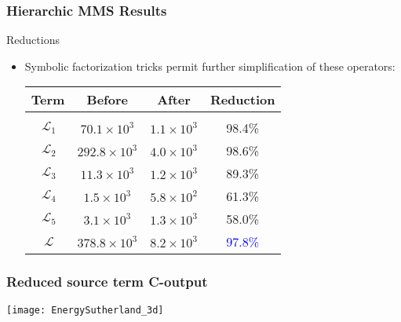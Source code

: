 \documentclass[mathserif]{beamer}
\newcommand{\Lo}{\,\mathcal{L}}
\begin{document}
\begin{frame}
  \frametitle{Hierarchic MMS Results}
  \begin{block}{Reductions}
    \begin{itemize}
    \item Symbolic factorization tricks permit further simplification of these operators:
      \newline
      \begin{table}[htb]
        \centering
        \begin{tabular}{c c c c}
          \hline
          Term & Before & After & Reduction\\
          \hline \vspace{-8pt} \\
          $\Lo_1$ & $70.1 \times 10^3$ & $1.1 \times 10^3$ & 98.4\%\\ 
          $\Lo_2$ & $292.8\times 10^3$ & $4.0 \times 10^3$ & 98.6\%\\ 
          $\Lo_3$ & $11.3 \times 10^3$ & $1.2 \times 10^3$ & 89.3\%\\
          $\Lo_4$ & $1.5\times 10^3$   & $5.8 \times 10^2$ & 61.3\%\\
          $\Lo_5$ & $3.1  \times 10^3$ & $1.3 \times 10^3$ & 58.0\%\\
          $\Lo  $ & $378.8\times 10^3$ & $8.2 \times 10^3$ & \textcolor{blue}{97.8\%} \\[.5ex]
          \hline
        \end{tabular}
        \label{table_charac}
      \end{table}

    \end{itemize}
  \end{block}

\end{frame}

\begin{frame}
  \frametitle{Reduced source term C-output}
  \vspace{-15pt}
  \hspace{-1cm}\quad
  \texttt{[image: EnergySutherland\_3d]}
\end{frame}
\end{document}
